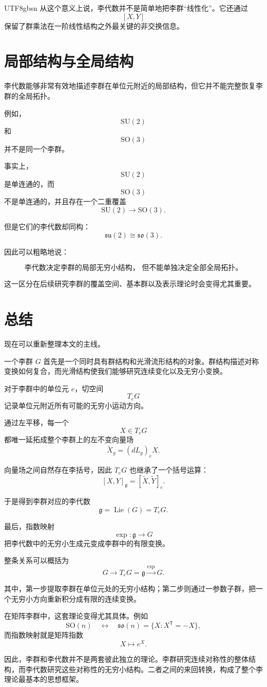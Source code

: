 \documentclass[11pt]{article}
\begin{document}
\begin{CJK*}{UTF8}{gbsn}
从这个意义上说，李代数并不是简单地把李群“线性化”。它还通过
\[
[X,Y]
\]
保留了群乘法在一阶线性结构之外最关键的非交换信息。


\section{局部结构与全局结构}

李代数能够非常有效地描述李群在单位元附近的局部结构，但它并不能完整恢复李群的全局拓扑。

例如，
\[
\mathrm{SU}(2)
\]
和
\[
\mathrm{SO}(3)
\]
并不是同一个李群。

事实上，
\[
\mathrm{SU}(2)
\]
是单连通的，而
\[
\mathrm{SO}(3)
\]
不是单连通的，并且存在一个二重覆盖
\[
\mathrm{SU}(2)\longrightarrow\mathrm{SO}(3).
\]

但是它们的李代数却同构：
\[
\mathfrak{su}(2)
\cong
\mathfrak{so}(3).
\]

因此可以粗略地说：

\[
\boxed{
\text{李代数决定李群的局部无穷小结构，
但不能单独决定全部全局拓扑。}
}
\]

这一区分在后续研究李群的覆盖空间、基本群以及表示理论时会变得尤其重要。


\section{总结}

现在可以重新整理本文的主线。

一个李群 $G$ 首先是一个同时具有群结构和光滑流形结构的对象。群结构描述对称变换如何复合，而光滑结构使我们能够研究连续变化以及无穷小变换。

对于李群中的单位元 $e$，切空间
\[
T_eG
\]
记录单位元附近所有可能的无穷小运动方向。

通过左平移，每一个
\[
X\in T_eG
\]
都唯一延拓成整个李群上的左不变向量场
\[
\widetilde X_g=(dL_g)_eX.
\]

向量场之间自然存在李括号，因此 $T_eG$ 也继承了一个括号运算：
\[
[X,Y]_{\mathfrak g}
=
[\widetilde X,\widetilde Y]_e.
\]

于是得到李群对应的李代数
\[
\mathfrak g
=
\operatorname{Lie}(G)
=
T_eG.
\]

最后，指数映射
\[
\exp:\mathfrak g\to G
\]
把李代数中的无穷小生成元变成李群中的有限变换。

整条关系可以概括为
\[
\boxed{
G
\longrightarrow
T_eG=\mathfrak g
\overset{\exp}{\longrightarrow}
G.
}
\]

其中，第一步提取李群在单位元处的无穷小结构；第二步则通过一参数子群，把一个无穷小方向重新积分成有限的连续变换。

在矩阵李群中，这套理论变得尤其具体。例如
\[
\mathrm{SO}(n)
\quad\longleftrightarrow\quad
\mathfrak{so}(n)
=
\{X:X^{\mathsf T}=-X\},
\]
而指数映射就是矩阵指数
\[
X\longmapsto e^X.
\]

因此，李群和李代数并不是两套彼此独立的理论。李群研究连续对称性的整体结构，而李代数研究这些对称性的无穷小结构。二者之间的来回转换，构成了整个李理论最基本的思想框架。

\end{CJK*}
\end{document}
